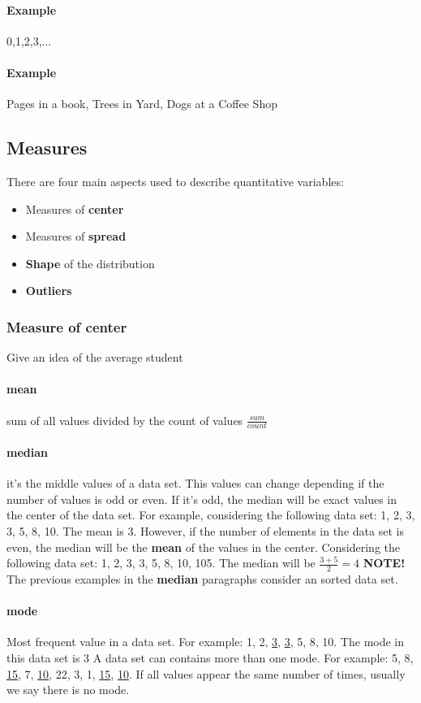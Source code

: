 \documentclass[]{article}
\begin{document}
\paragraph{Example} 0,1,2,3,...
\paragraph{Example} Pages in a book, Trees in Yard, Dogs at a Coffee Shop


\subsection{Measures}
There are four main aspects used to describe quantitative variables:
\begin{itemize}
\item Measures of \textbf{center}
\item Measures of \textbf{spread}
\item \textbf{Shape} of the distribution
\item \textbf{Outliers}
\end{itemize}


\subsubsection{Measure of center} Give an idea of the average student
\paragraph{mean} sum of all values divided by the count of values $ \frac{sum}{count} $
\paragraph{median} it's the middle values of a data set. This values can change depending if the number of values is odd or even. If it's odd, the median will be exact values in the center of the data set. For example, considering the following data set: 1, 2, 3, 3, 5, 8, 10. The mean is 3. 
However, if the number of elements in the data set is even, the median will be the \textbf{mean} of the values in the center. Considering the following data set: 1, 2, 3, 3, 5, 8, 10, 105. The median will be $ \frac{3+5}{2} = 4 $
%
\textbf{NOTE!} The previous examples in the \textbf{median} paragraphs consider an sorted data set.
\paragraph{mode} Most frequent value in a data set. For example: 1, 2, \underline{3}, \underline{3}, 5, 8, 10. The mode in this data set is 3
A data set can contains more than one mode. For example: 5, 8, \underline{15}, 7, \underline{10}, 22, 3, 1, \underline{15}, \underline{10}. If all values appear the same number of times, usually we say there is no mode.
\end{document}
